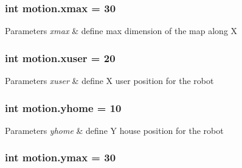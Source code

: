 \subsubsection[{\texorpdfstring{xmax}{xmax}}]{\setlength{\rightskip}{0pt plus 5cm}int motion.\+xmax = 30}\hypertarget{namespacemotion_ad15e7b7b1c76162401252ee7533515a4}{}\label{namespacemotion_ad15e7b7b1c76162401252ee7533515a4}

\begin{DoxyParams}{Parameters}
{\em xmax} & define max dimension of the map along X \\
\hline
\end{DoxyParams}
\subsubsection[{\texorpdfstring{xuser}{xuser}}]{\setlength{\rightskip}{0pt plus 5cm}int motion.\+xuser = 20}\hypertarget{namespacemotion_ac1191b288873954280855513ee9ed701}{}\label{namespacemotion_ac1191b288873954280855513ee9ed701}

\begin{DoxyParams}{Parameters}
{\em xuser} & define X user position for the robot \\
\hline
\end{DoxyParams}
\subsubsection[{\texorpdfstring{yhome}{yhome}}]{\setlength{\rightskip}{0pt plus 5cm}int motion.\+yhome = 10}\hypertarget{namespacemotion_ad24c81915bdf6ae465698c9f63e0c419}{}\label{namespacemotion_ad24c81915bdf6ae465698c9f63e0c419}

\begin{DoxyParams}{Parameters}
{\em yhome} & define Y house position for the robot \\
\hline
\end{DoxyParams}
\subsubsection[{\texorpdfstring{ymax}{ymax}}]{\setlength{\rightskip}{0pt plus 5cm}int motion.\+ymax = 30}\hypertarget{namespacemotion_a93496959e7cd7b64c958600e13052b02}{}\label{namespacemotion_a93496959e7cd7b64c958600e13052b02}


